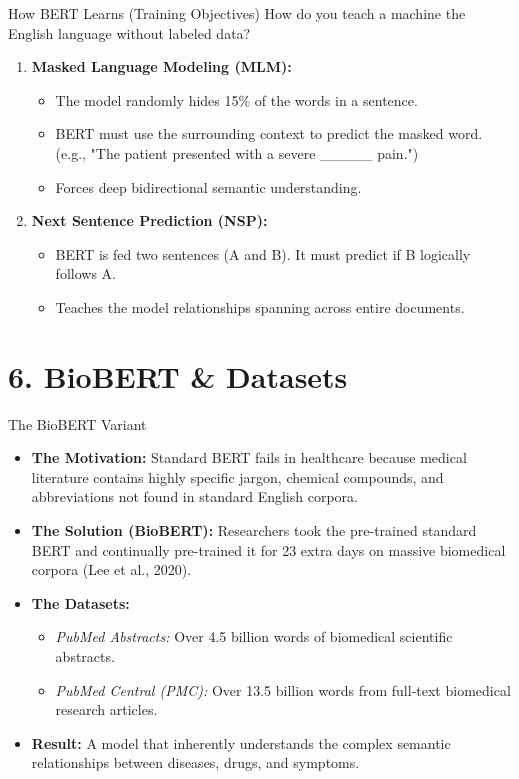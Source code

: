 \documentclass[aspectratio=169]{beamer}
\begin{document}
	\begin{frame}{How BERT Learns (Training Objectives)}
		How do you teach a machine the English language without labeled data?
		\vspace{0.3cm}
		
		\begin{enumerate}
			\item \textbf{Masked Language Modeling (MLM):} 
			\begin{itemize}
				\item The model randomly hides 15\% of the words in a sentence.
				\item BERT must use the surrounding context to predict the masked word. (e.g., "The patient presented with a severe \_\_\_\_\_ pain.")
				\item Forces deep bidirectional semantic understanding.
			\end{itemize}
			\item \textbf{Next Sentence Prediction (NSP):}
			\begin{itemize}
				\item BERT is fed two sentences (A and B). It must predict if B logically follows A.
				\item Teaches the model relationships spanning across entire documents.
			\end{itemize}
		\end{enumerate}
	\end{frame}
	
	\section{6. BioBERT \& Datasets}
	
	\begin{frame}{The BioBERT Variant}
		\begin{itemize}
			\item \textbf{The Motivation:} Standard BERT fails in healthcare because medical literature contains highly specific jargon, chemical compounds, and abbreviations not found in standard English corpora.
			\item \textbf{The Solution (BioBERT):} Researchers took the pre-trained standard BERT and continually pre-trained it for 23 extra days on massive biomedical corpora (Lee et al., 2020).
			\item \textbf{The Datasets:}
			\begin{itemize}
				\item \textit{PubMed Abstracts:} Over 4.5 billion words of biomedical scientific abstracts.
				\item \textit{PubMed Central (PMC):} Over 13.5 billion words from full-text biomedical research articles.
			\end{itemize}
			\item \textbf{Result:} A model that inherently understands the complex semantic relationships between diseases, drugs, and symptoms.
		\end{itemize}
	\end{frame}
	
\end{document}
